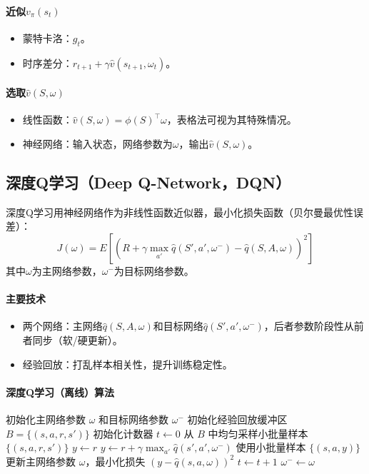 \documentclass[
12pt, %
a4paper, 
oneside, %
headinclude,footinclude, %
]{scrartcl}
\begin{document}
\paragraph{近似$ v_\pi(s_t) $}
\begin{itemize}
\item 蒙特卡洛：$ g_t $。
\item 时序差分：$ r_{t + 1} + \gamma \hat{v}(s_{t + 1}, \omega_t) $。
\end{itemize}
\paragraph{选取$ \hat{v}(S, \omega) $}
\begin{itemize}
\item 线性函数：$ \hat{v}(S, \omega) = \phi(S)^\top \omega $，表格法可视为其特殊情况。
\item 神经网络：输入状态，网络参数为$ \omega $，输出$ \hat{v}(S, \omega) $。
\end{itemize}
\subsection{深度Q学习（Deep Q-Network，DQN）}
深度Q学习用神经网络作为非线性函数近似器，最小化损失函数（贝尔曼最优性误差）：
$$
J(\omega) = E[(R + \gamma \max_{a'} \hat{q}(S', a', \omega^-) - \hat{q}(S, A, \omega))^2]
$$
其中$ \omega $为主网络参数，$ \omega^- $为目标网络参数。
\paragraph{主要技术}
\begin{itemize}
\item 两个网络：主网络$ \hat{q}(S, A, \omega) $和目标网络$ \hat{q}(S', a', \omega^-) $，后者参数阶段性从前者同步（软/硬更新）。
\item 经验回放：打乱样本相关性，提升训练稳定性。
\end{itemize}
\paragraph{深度Q学习（离线）算法}
\begin{myalgorithm}
\State 初始化主网络参数 $\omega$ 和目标网络参数 $\omega^-$
\State 初始化经验回放缓冲区 $B = \{(s, a, r, s')\}$
\State 初始化计数器 $t \gets 0$
\Loop
    \State 从 $B$ 中均匀采样小批量样本 $\{(s, a, r, s')\}$
            \State $y \gets r$
        \Else
            \State $y \gets r + \gamma \max_{a'} \hat{q}(s', a', \omega^-)$ 
        \EndIf
    \EndFor
    \State 使用小批量样本 $\{(s, a, y)\}$ 更新主网络参数 $\omega$，最小化损失 $(y - \hat{q}(s, a, \omega))^2$
    \State $t \gets t + 1$
     
        \State $\omega^- \gets \omega$
    \EndIf
\EndLoop
\end{myalgorithm}
\end{document}
